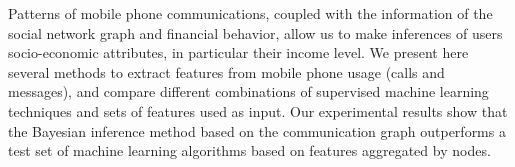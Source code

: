 Patterns of mobile phone communications, coupled with the information of the social network graph and financial behavior, allow us to make inferences of users socio-economic attributes, in particular their income level.
We present here several methods to extract features from mobile phone usage (calls and messages), and compare different combinations of supervised machine learning techniques and sets of features used as input.
Our experimental results show that the Bayesian inference method based on the communication graph outperforms a test set of machine learning algorithms based on features aggregated by nodes.
